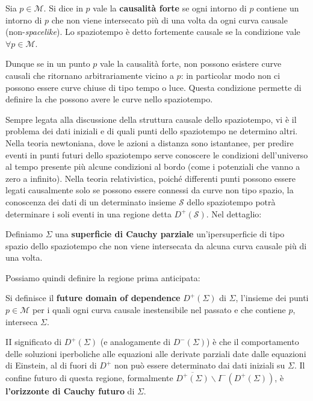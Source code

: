 \begin{definizione}
Sia $p \in \mathcal{M}$. Si dice in $p$ vale la \textbf{causalità forte} se ogni intorno di $p$ contiene un intorno di $p$ che non viene intersecato più di una volta da ogni curva causale (non-\textit{spacelike}).
Lo spaziotempo è detto fortemente causale se la condizione vale $\forall p \in \mathcal{M}$.
\end{definizione}
Dunque se in un punto $p$ vale la causalità forte, non possono esistere curve causali che ritornano arbitrariamente vicino a $p$: in particolar modo non ci possono essere curve chiuse di tipo tempo o luce. Questa condizione permette di definire la  che possono avere le curve nello spaziotempo.

Sempre legata alla discussione della struttura causale dello spaziotempo, vi è il problema dei dati iniziali e di quali punti dello spaziotempo ne determino altri. Nella teoria newtoniana, dove le azioni a distanza sono istantanee, per predire eventi in punti futuri dello spaziotempo serve  conoscere le condizioni dell'universo al tempo presente più alcune condizioni al bordo (come i potenziali che vanno a zero a infinito). Nella teoria relativistica, poiché differenti punti possono essere legati causalmente solo se possono essere connessi da curve non tipo spazio, la conoscenza dei dati di un determinato insieme $\mathcal{S}$ dello spaziotempo potrà determinare i soli eventi in una regione detta $D^+(\mathcal{S})$. Nel dettaglio:
\begin{definizione}
Definiamo $\Sigma$ una \textbf{superficie di Cauchy parziale} un'ipersuperficie di tipo spazio dello spaziotempo che non viene intersecata da alcuna curva causale più di una volta.
\end{definizione}
Possiamo quindi definire la regione prima anticipata:
\begin{definizione}
Si definisce il \textbf{future domain of dependence} $D^+(\Sigma)$ di $\Sigma$, l'insieme dei punti $p \in \mathcal{M}$ per i quali ogni curva causale inestensibile nel passato e che contiene $p$, interseca $\Sigma$.
\end{definizione}
II significato di $D^+(\Sigma)$ (e analogamente di $D^-(\Sigma)$) è che il comportamento delle soluzioni iperboliche alle equazioni alle derivate parziali date dalle equazioni di Einstein, al di fuori di $D^+$ non può essere determinato dai dati iniziali su $\Sigma$.  Il confine futuro di questa regione, formalmente $\overline{D^+(\Sigma)}\smallsetminus I^-(D^+(\Sigma))$, è \textbf{l'orizzonte di Cauchy futuro} di $\Sigma$. 

